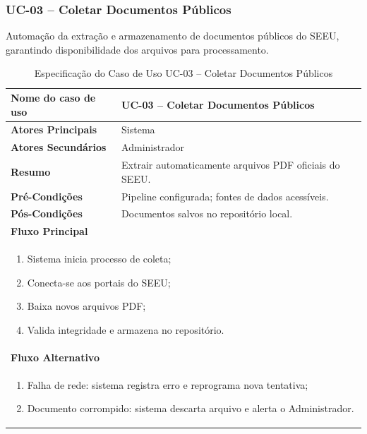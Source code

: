 \begin{description}
\subsubsection{UC-03 – Coletar Documentos Públicos}
\noindent Automação da extração e armazenamento de documentos públicos do SEEU, garantindo disponibilidade dos arquivos para processamento.
\begin{table}[H]
  \centering
  \caption{Especificação do Caso de Uso UC-03 – Coletar Documentos Públicos}
  \label{tab:uc03}
  \begin{tabular}{|p{4cm}|p{11cm}|}
    \hline
    \textbf{Nome do caso de uso}    & UC-03 – Coletar Documentos Públicos \\ \hline
    \textbf{Atores Principais}      & Sistema                              \\ \hline
    \textbf{Atores Secundários}     & Administrador                        \\ \hline
    \textbf{Resumo}                 & Extrair automaticamente arquivos PDF oficiais do SEEU. \\ \hline
    \textbf{Pré-Condições}          & Pipeline configurada; fontes de dados acessíveis. \\ \hline
    \textbf{Pós-Condições}          & Documentos salvos no repositório local. \\ \hline
    \multicolumn{2}{|l|}{\textbf{Fluxo Principal}} \\ \hline
    \multicolumn{2}{|p{15cm}|}{%
      \begin{enumerate}[leftmargin=*]
        \item Sistema inicia processo de coleta;
        \item Conecta-se aos portais do SEEU;
        \item Baixa novos arquivos PDF;
        \item Valida integridade e armazena no repositório.
      \end{enumerate}
    } \\ \hline
    \multicolumn{2}{|l|}{\textbf{Fluxo Alternativo}} \\ \hline
    \multicolumn{2}{|p{15cm}|}{%
      \begin{enumerate}[label=\arabic* a\,.]
        \item Falha de rede: sistema registra erro e reprograma nova tentativa;
        \item Documento corrompido: sistema descarta arquivo e alerta o Administrador.
      \end{enumerate}
    } \\ \hline
  \end{tabular}
\end{table}


\end{description}

